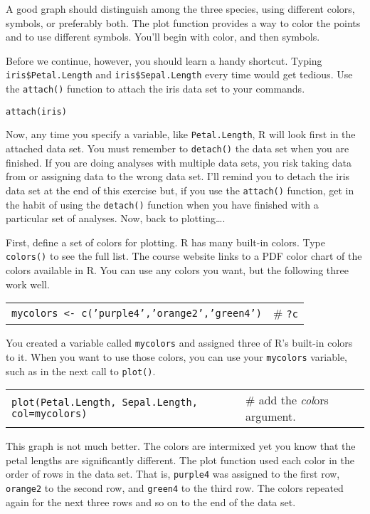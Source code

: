 \documentclass[11pt]{article}
\begin{document}
A good graph should distinguish among the three species, using different
colors, symbols, or preferably both. The plot function provides a way to
color the points and to use different symbols. You'll begin with color,
and then symbols.

Before we continue, however, you should learn a handy shortcut. Typing
\texttt{iris\$Petal.Length} and \texttt{iris\$Sepal.Length} every time would get tedious.
Use the \texttt{attach()} function to attach the iris data set to your commands.

\texttt{attach(iris)}

Now, any time you specify a variable, like \texttt{Petal.Length}, R will look
first in the attached data set. You must remember to \texttt{detach()} the data
set when you are finished. If you are doing analyses with multiple data
sets, you risk taking data from or assigning data to the wrong data set.
I'll remind you to detach the iris data set at the end of this exercise
but, if you use the \texttt{attach()} function, get in the habit of using the
\texttt{detach()} function when you have finished with a particular set of
analyses. Now, back to plotting\ldots{}.

First, define a set of colors for plotting. R has many built-in colors.
Type \texttt{colors()} to see the full list. The course website links to a PDF
color chart of the colors available in R. You can use any colors you
want, but the following three work well.

\begin{tabular}{@{}L{3.5in}L{2in}@{}}
\texttt{mycolors \textless{}- c('purple4','orange2','green4')} & \# \texttt{?c} \\
\end{tabular}

You created a variable called \texttt{mycolors} and assigned three of R's
built-in colors to it. When you want to use those colors, you can use
your \texttt{mycolors} variable, such as in the next call to \texttt{plot()}.

\begin{tabular}{@{}L{3.5in}L{2in}@{}}
\texttt{plot(Petal.Length, Sepal.Length, col=mycolors)} & \# add the \emph{col}ors
argument.\\
\end{tabular}

This graph is not much better. The colors are intermixed yet you know
that the petal lengths are significantly different. The plot function
used each color in the order of rows in the data set. That is, \texttt{purple4}
was assigned to the first row, \texttt{orange2} to the second row, and \texttt{green4} to
the third row. The colors repeated again for the next three rows and so
on to the end of the data set.
\end{document}
